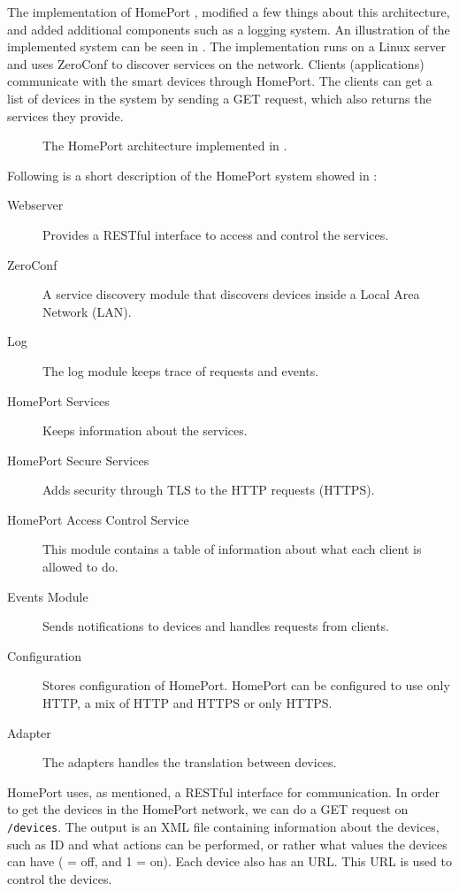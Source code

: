 The implementation of HomePort \cite{HOMEPORT13}, 
modified a few things about this architecture, 
and added additional components such as a logging system. 
An illustration of the implemented system can be seen in .
The implementation runs on a Linux server and uses ZeroConf to discover services on the network. 
Clients (\eg applications) communicate with the smart devices through HomePort. 
The clients can get a list of devices in the system by sending a GET request, 
which also returns the services they provide. 

\begin{figure}[!htb]
    \centering
    
    \caption{The HomePort architecture implemented in \protect\cite{HOMEPORT13}.}
    \label{fig:homeport2}
\end{figure}

Following is a short description of the HomePort system showed in :
\begin{description}
    \item[Webserver] Provides a RESTful interface to access and control the services.
    \item[ZeroConf] A service discovery module that discovers devices inside a Local Area Network (LAN).
    \item[Log] The log module keeps trace of requests and events. 
    \item[HomePort Services] Keeps information about the services. 
    \item[HomePort Secure Services] Adds security through TLS to the HTTP requests (HTTPS).
    \item[HomePort Access Control Service] This module contains a table of information about what each client is allowed to do. 
    \item[Events Module] Sends notifications to devices and handles requests from clients.
    \item[Configuration] Stores configuration of HomePort. HomePort can be configured to use only HTTP, a mix of HTTP and HTTPS or only HTTPS.
    \item[Adapter] The adapters handles the translation between devices. 
\end{description}

HomePort uses, as mentioned, a RESTful interface for communication. 
In order to get the devices in the HomePort network, 
we can do a GET request on \texttt{/devices}.
The output is an XML file containing information about the devices,
such as ID and what actions can be performed,
or rather what values the devices can have ( = off, and 1 = on).
Each device also has an URL. 
This URL is used to control the devices. 

